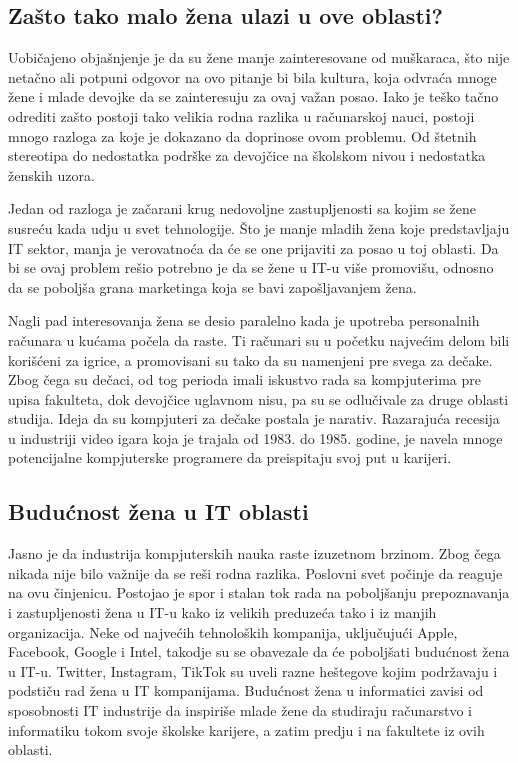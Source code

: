 \documentclass[a4paper,12pt]{article}
\begin{document}
\subsection{Zašto tako malo žena ulazi u ove oblasti? }
\begin{flushleft}
Uobičajeno objašnjenje je da su žene manje zainteresovane od muškaraca, 
što nije netačno ali potpuni odgovor na ovo pitanje bi bila kultura, 
koja odvraća mnoge žene i mlade devojke da se zainteresuju za ovaj važan posao.
Iako je teško tačno odrediti zašto postoji tako velikia rodna razlika u računarskoj nauci, 
postoji mnogo razloga za koje je dokazano da doprinose ovom problemu. 
Od štetnih stereotipa do nedostatka podrške za devojčice na školskom nivou i nedostatka ženskih uzora.

Jedan od razloga je začarani krug nedovoljne zastupljenosti sa kojim se žene susreću kada udju u svet tehnologije. 
Što je manje mladih žena koje predstavljaju IT sektor, manja je verovatnoća da će se one prijaviti za posao u toj oblasti. 
Da bi se ovaj problem rešio potrebno je da se žene u IT-u više promovišu, 
odnosno da se poboljša grana marketinga koja se bavi zapošljavanjem žena.


Nagli pad interesovanja žena se desio paralelno kada je upotreba personalnih računara u kućama počela da raste. 
Ti računari su u početku najvećim delom bili korišćeni za igrice, a promovisani su tako da su namenjeni pre svega za dečake. 
Zbog čega su dečaci, od tog perioda imali iskustvo rada sa kompjuterima pre upisa fakulteta, dok devojčice uglavnom nisu, 
pa su se odlučivale za druge oblasti studija. Ideja da su kompjuteri za dečake postala je narativ. 
Razarajuća recesija u industriji video igara koja je trajala od 1983. do 1985. godine, je navela mnoge potencijalne 
kompjuterske programere da preispitaju svoj put u karijeri. 
\end{flushleft}


\subsection{Budućnost žena u IT oblasti}
\begin{flushleft}
Jasno je da industrija kompjuterskih nauka raste izuzetnom brzinom. Zbog čega nikada nije bilo važnije da se reši rodna razlika.
Poslovni svet počinje da reaguje na ovu činjenicu. Postojao je spor i stalan tok rada na poboljšanju prepoznavanja i zastupljenosti
žena u IT-u kako iz velikih preduzeća tako i iz manjih organizacija. Neke od najvećih tehnoloških kompanija, uključujući Apple, 
Facebook, Google i Intel, takodje su se obavezale da će poboljšati budućnost žena u IT-u. Twitter, Instagram, TikTok su uveli razne 
heštegove kojim podržavaju i podstiču rad žena u IT kompanijama. Budućnost žena u informatici zavisi od sposobnosti IT industrije 
da inspiriše mlade žene da studiraju računarstvo i informatiku tokom svoje školske karijere, a zatim predju i na fakultete iz ovih oblasti.
\end{flushleft}
\end{document}
